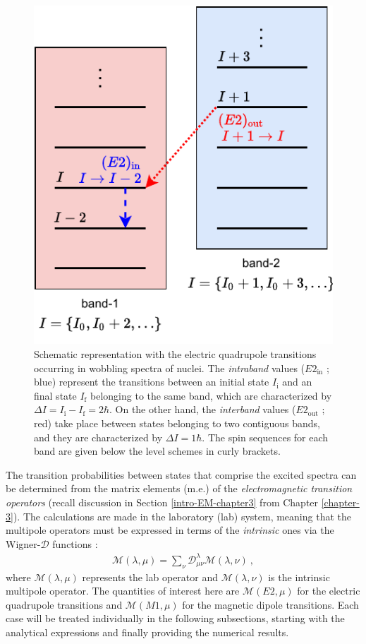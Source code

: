 \begin{figure}
    \centering
    \includegraphics[scale=1.1]{Chapters/Figures/transitions-wobbling-states.pdf}
    \caption{Schematic representation with the electric quadrupole transitions occurring in wobbling spectra of nuclei. The \emph{intraband} values ($E2_\text{in}$ ; blue) represent the transitions between an initial state $I_\text{i}$ and an final state $I_\text{f}$ belonging to the same band, which are characterized by $\Delta I=I_\text{i}-I_\text{f}=2\hbar$. On the other hand, the \emph{interband} values ($E2_\text{out}$ ; red) take place between states belonging to two contiguous bands, and they are characterized by $\Delta I=1\hbar$. The spin sequences for each band are given below the level schemes in curly brackets.}
    \label{schematic-interband-intraband-E2}
\end{figure}

The transition probabilities between states that comprise the excited spectra can be determined from the matrix elements (m.e.) of the \emph{electromagnetic transition operators} (recall discussion in Section \ref{intro-EM-chapter3} from Chapter \ref{chapter-3}). The calculations are made in the laboratory (lab) system, meaning that the multipole operators must be expressed in terms of the \emph{intrinsic} ones via the Wigner-$\mathcal{D}$ functions \cite{toki1975asymmetric,bohr1998nuclear}:
\begin{align}
    \mathcal{M}(\lambda,\mu)=\sum_\nu\mathcal{D}_{\mu\nu}^\lambda\mathcal{M}(\lambda,\nu)\ ,
    \label{multipole-operator-lab}
\end{align}
where $\mathcal{M}(\lambda,\mu)$ represents the lab operator and $\mathcal{M}(\lambda,\nu)$ is the intrinsic multipole operator. The quantities of interest here are $\mathcal{M}(E2,\mu)$ for the electric quadrupole transitions and $\mathcal{M}(M1,\mu)$ for the magnetic dipole transitions. Each case will be treated individually in the following subsections, starting with the analytical expressions and finally providing the numerical results.

